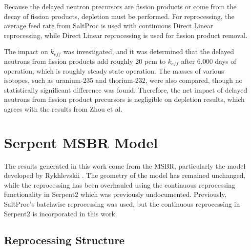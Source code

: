 Because the delayed neutron precursors are fission products or come from the decay of fission products, depletion must be performed. For reprocessing, the average feed rate from SaltProc is used with continuous Direct Linear reprocessing, while Direct Linear reprocessing is used for fission product removal. 

The impact on $k_{eff}$ was investigated, and it was determined that the delayed neutrons from fission products add roughly 20 pcm to $k_{eff}$ after 6,000 days of operation, which is roughly steady state operation. The masses of various isotopes, such as uranium-235 and thorium-232, were also compared, though no statistically significant difference was found. Therefore, the net impact of delayed neutrons from fission product precursors is negligible on depletion results, which agrees with the results from Zhou et al.











\section{Serpent MSBR Model}

The results generated in this work come from the MSBR, particularly the model developed by Rykhlevskii \cite{rykhlevskii_advanced_2018}. The geometry of the model has remained unchanged, while the reprocessing has been overhauled using the continuous reprocessing functionality in Serpent2 which was previously undocumented. Previously, SaltProc's batchwise reprocessing was used, but the continuous reprocessing in Serpent2 is incorporated in this work.

\subsection{Reprocessing Structure}

